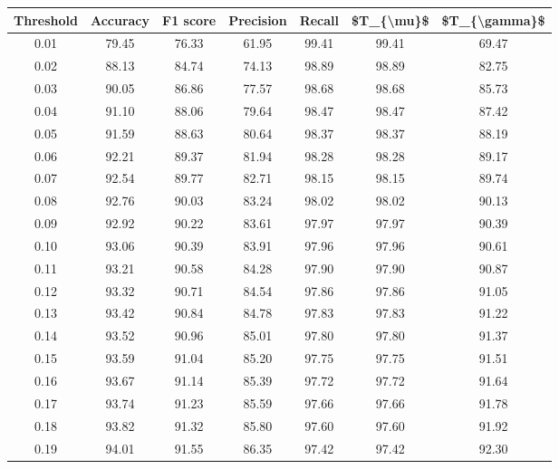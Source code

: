 \begin{tabular}{|c|c|c|c|c|c|c|}
\toprule
 Threshold &  Accuracy &  F1 score &  Precision &  Recall &  \$T\_\{\textbackslash mu\}\$ &  \$T\_\{\textbackslash gamma\}\$ \\
\hline
      0.01 &     79.45 &     76.33 &      61.95 &   99.41 &      99.41 &         69.47 \\
      0.02 &     88.13 &     84.74 &      74.13 &   98.89 &      98.89 &         82.75 \\
      0.03 &     90.05 &     86.86 &      77.57 &   98.68 &      98.68 &         85.73 \\
      0.04 &     91.10 &     88.06 &      79.64 &   98.47 &      98.47 &         87.42 \\
      0.05 &     91.59 &     88.63 &      80.64 &   98.37 &      98.37 &         88.19 \\
      0.06 &     92.21 &     89.37 &      81.94 &   98.28 &      98.28 &         89.17 \\
      0.07 &     92.54 &     89.77 &      82.71 &   98.15 &      98.15 &         89.74 \\
      0.08 &     92.76 &     90.03 &      83.24 &   98.02 &      98.02 &         90.13 \\
      0.09 &     92.92 &     90.22 &      83.61 &   97.97 &      97.97 &         90.39 \\
      0.10 &     93.06 &     90.39 &      83.91 &   97.96 &      97.96 &         90.61 \\
      0.11 &     93.21 &     90.58 &      84.28 &   97.90 &      97.90 &         90.87 \\
      0.12 &     93.32 &     90.71 &      84.54 &   97.86 &      97.86 &         91.05 \\
      0.13 &     93.42 &     90.84 &      84.78 &   97.83 &      97.83 &         91.22 \\
      0.14 &     93.52 &     90.96 &      85.01 &   97.80 &      97.80 &         91.37 \\
      0.15 &     93.59 &     91.04 &      85.20 &   97.75 &      97.75 &         91.51 \\
      0.16 &     93.67 &     91.14 &      85.39 &   97.72 &      97.72 &         91.64 \\
      0.17 &     93.74 &     91.23 &      85.59 &   97.66 &      97.66 &         91.78 \\
      0.18 &     93.82 &     91.32 &      85.80 &   97.60 &      97.60 &         91.92 \\
      0.19 &     94.01 &     91.55 &      86.35 &   97.42 &      97.42 &         92.30 \\

\end{tabular}
